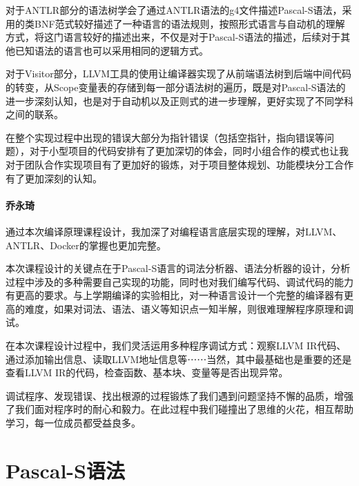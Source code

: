 \documentclass[lang=cn,11pt,a4paper,cite=authornum]{paper}
\begin{document}
对于ANTLR部分的语法树学会了通过ANTLR语法的g4文件描述Pascal-S语法，采用的类BNF范式较好描述了一种语言的语法规则，按照形式语言与自动机的理解方式，将这门语言较好的描述出来，不仅是对于Pascal-S语法的描述，后续对于其他已知语法的语言也可以采用相同的逻辑方式。

对于Visitor部分，LLVM工具的使用让编译器实现了从前端语法树到后端中间代码的转变，从Scope变量表的存储到每一部分语法树的遍历，既是对Pascal-S语法的进一步深刻认知，也是对于自动机以及正则式的进一步理解，更好实现了不同学科之间的联系。

在整个实现过程中出现的错误大部分为指针错误（包括空指针，指向错误等问题），对于小型项目的代码安排有了更加深切的体会，同时小组合作的模式也让我对于团队合作实现项目有了更加好的锻炼，对于项目整体规划、功能模块分工合作有了更加深刻的认知。

\paragraph{乔永琦} 通过本次编译原理课程设计，我加深了对编程语言底层实现的理解，对LLVM、ANTLR、Docker的掌握也更加完整。

本次课程设计的关键点在于Pascal-S语言的词法分析器、语法分析器的设计，分析过程中涉及的多种需要自己实现的功能，同时也对我们编写代码、调试代码的能力有更高的要求。与上学期编译的实验相比，对一种语言设计一个完整的编译器有更高的难度，如果对词法、语法、语义等知识点一知半解，则很难理解程序原理和调试。

在本次课程设计过程中，我们灵活运用多种程序调试方式：观察LLVM IR代码、通过添加输出信息、读取LLVM地址信息等⋯⋯当然，其中最基础也是重要的还是查看LLVM IR的代码，检查函数、基本块、变量等是否出现异常。

调试程序、发现错误、找出根源的过程锻炼了我们遇到问题坚持不懈的品质，增强了我们面对程序时的耐心和毅力。在此过程中我们碰撞出了思维的火花，相互帮助学习，每一位成员都受益良多。

\appendix

\section{Pascal-S语法}

\label{PascalS}
\end{document}
